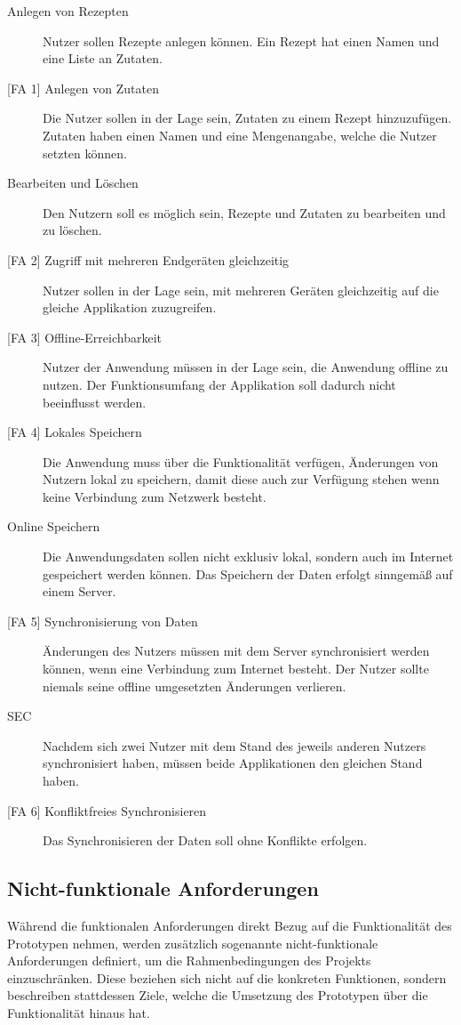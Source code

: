 \documentclass[a4paper, 12pt]{scrreprt}
\begin{document}
\begin{description}
	\item[Anlegen von Rezepten]
	Nutzer sollen Rezepte anlegen können. Ein Rezept hat einen Namen und eine Liste an Zutaten. 
	\item[{[FA 1]} Anlegen von Zutaten]
	Die Nutzer sollen in der Lage sein, Zutaten zu einem Rezept hinzuzufügen. Zutaten haben einen Namen und eine Mengenangabe, welche die Nutzer setzten können.
	\item[Bearbeiten und Löschen]
	Den Nutzern soll es möglich sein, Rezepte und Zutaten zu bearbeiten und zu löschen. 
	\item[{[FA 2]} Zugriff mit mehreren Endgeräten gleichzeitig]
	Nutzer sollen in der Lage sein, mit mehreren Geräten gleichzeitig auf die gleiche Applikation zuzugreifen.
	\item[{[FA 3]} Offline-Erreichbarkeit]
	Nutzer der Anwendung müssen in der Lage sein, die Anwendung offline zu nutzen. Der Funktionsumfang der Applikation soll dadurch nicht beeinflusst werden. 
	\item[{[FA 4]} Lokales Speichern]
	Die Anwendung muss über die Funktionalität verfügen, Änderungen von Nutzern lokal zu speichern, damit diese auch zur Verfügung stehen wenn keine Verbindung zum Netzwerk besteht.
	\item[Online Speichern]
	Die Anwendungsdaten sollen nicht exklusiv lokal, sondern auch im Internet gespeichert werden können. Das Speichern der Daten erfolgt sinngemäß auf einem Server. 
	\item[{[FA 5]} Synchronisierung von Daten]
	Änderungen des Nutzers müssen mit dem Server synchronisiert werden können, wenn eine Verbindung zum Internet besteht. Der Nutzer sollte niemals seine offline umgesetzten Änderungen verlieren.
	\item[\ac{SEC}] Nachdem sich zwei Nutzer mit dem Stand des jeweils anderen Nutzers synchronisiert haben, müssen beide Applikationen den gleichen Stand haben.
	\item[{[FA 6] Konfliktfreies Synchronisieren}] Das Synchronisieren der Daten soll ohne Konflikte erfolgen. 
\end{description}


\subsection{Nicht-funktionale Anforderungen}
Während die funktionalen Anforderungen direkt Bezug auf die Funktionalität des Prototypen nehmen, werden zusätzlich sogenannte nicht-funktionale Anforderungen definiert, um die Rahmenbedingungen des Projekts einzuschränken. Diese beziehen sich nicht auf die konkreten Funktionen, sondern beschreiben stattdessen Ziele, welche die Umsetzung des Prototypen über die Funktionalität hinaus hat. 
\end{document}
